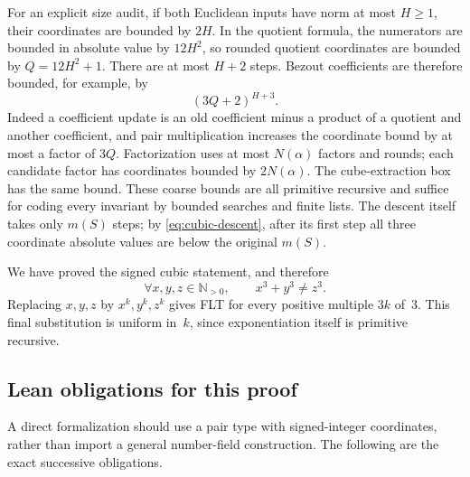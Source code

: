 For an explicit size audit, if both Euclidean inputs have norm at most
$H\ge1$, their coordinates are bounded by $2H$.  In the quotient
formula, the numerators are bounded in absolute value by $12H^2$,
so rounded quotient coordinates are bounded by $Q=12H^2+1$.
There are at most $H+2$ steps.  Bezout coefficients are therefore
bounded, for example, by
\[
 (3Q+2)^{H+3}.
\]
Indeed a coefficient update is an old coefficient minus a product of
a quotient and another coefficient, and pair multiplication increases
the coordinate bound by at most a factor of $3Q$.
Factorization uses at most $N(\alpha)$ factors and rounds; each
candidate factor has coordinates bounded by $2N(\alpha)$.
The cube-extraction box has the same bound.  These coarse bounds are
all primitive recursive and suffice for coding every invariant by
bounded searches and finite lists.  The descent itself takes only
$m(S)$ steps; by \eqref{eq:cubic-descent}, after its first step all
three coordinate absolute values are below the original $m(S)$.

We have proved the signed cubic statement, and therefore
\[
 \forall x,y,z\in\mathbb N_{>0},\qquad x^3+y^3\ne z^3.
\]
Replacing $x,y,z$ by $x^k,y^k,z^k$ gives FLT for every positive
multiple $3k$ of~$3$.  This final substitution is uniform in~$k$,
since exponentiation itself is primitive recursive.

\subsection{Lean obligations for this proof}

A direct formalization should use a pair type with signed-integer
coordinates, rather than import a general number-field construction.
The following are the exact successive obligations.

